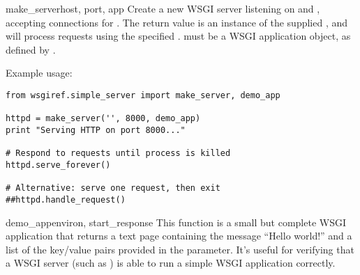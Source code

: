 \begin{funcdesc}{make_server}{host, port, app
}
Create a new WSGI server listening on  and ,
accepting connections for .  The return value is an instance of
the supplied , and will process requests using the
specified .   must be a WSGI application
object, as defined by .

Example usage:
\begin{verbatim}from wsgiref.simple_server import make_server, demo_app

httpd = make_server('', 8000, demo_app)
print "Serving HTTP on port 8000..."

# Respond to requests until process is killed
httpd.serve_forever()

# Alternative: serve one request, then exit
##httpd.handle_request()
\end{verbatim}

\end{funcdesc}






\begin{funcdesc}{demo_app}{environ, start_response}
This function is a small but complete WSGI application that
returns a text page containing the message ``Hello world!''
and a list of the key/value pairs provided in the
 parameter.  It's useful for verifying that a WSGI server
(such as ) is able to run a simple WSGI
application correctly.
\end{funcdesc}


